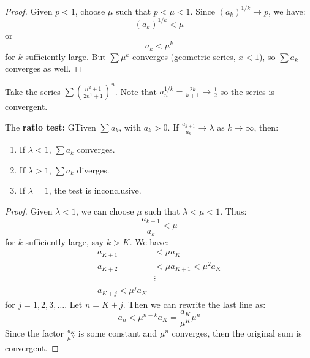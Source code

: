 \begin{itemize}
\begin{proof}
        Given $p<1$, choose $\mu$ such that $p<\mu<1$. Since $(a_k)^{1/k} \to p$, we have:
        \begin{equation}
            (a_k)^{1/k} < \mu
        \end{equation}
        or
        \begin{equation}
            a_k < \mu^k
        \end{equation}
        for $k$ sufficiently large. But $\sum \mu^k$ converges (geometric series, $x<1$), so $\sum a_k$ converges as well.
    \end{proof}
    \begin{example}
        Take the series $\sum \left(\frac{n^2+1}{2n^1+1}\right)^n$. Note that $a_n^{1/k}=\frac{2k}{k+1} \to \frac{1}{2}$ so the series is convergent.
    \end{example}
    \begin{theorem}
        The \textbf{ratio test:} GTiven $\sum a_k$, with $a_k>0$. If $\frac{a_{k+1}}{a_k}\to \lambda$ as $k\to\infty$, then:
        \begin{enumerate}
            \item If $\lambda < 1$, $\sum a_k$ converges.
            \item If $\lambda >1$, $\sum a_k$ diverges.
            \item If $\lambda = 1$, the test is inconclusive.
        \end{enumerate}
    \end{theorem}
    \begin{proof}
        Given $\lambda < 1$, we can choose $\mu$ such that $\lambda < \mu < 1$. Thus:
        \begin{equation}
            \frac{a_{k+1}}{a_k}<\mu
        \end{equation}
        for $k$ sufficiently large, say $k>K$. We have:
        \begin{align}
            a_{K+1} &< \mu a_K \\
            a_{K+2} &< \mu a_{K+1} < \mu^2 a_{K} \\ 
            &\vdots \\ 
            a_{K+j} < \mu^j a_K
        \end{align}
        for $j=1,2,3,\dots$. Let $n=K+j$. Then we can rewrite the last line as:
        \begin{equation}
            a_n < \mu^{n-k}a_K = \frac{a_K}{\mu^K}\mu^n
        \end{equation}
        Since the factor $\frac{a_K}{\mu^K}$ is some constant and $\mu^n$ converges, then the original sum is convergent.

\end{proof}
\end{itemize}
